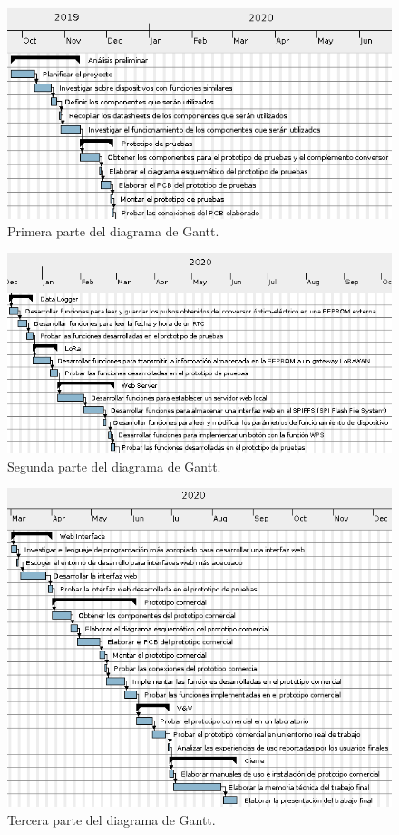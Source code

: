 \begin{figure}[h]
	\centering
	\includegraphics[scale=1]{./Figures/gantt1.png}
	\caption{Primera parte del diagrama de Gantt.}
	\label{fig:diagramAON}
\end{figure}

\begin{figure}[h]
	\centering
	\includegraphics[scale=1]{./Figures/gantt2.png}
	\caption{Segunda parte del diagrama de Gantt.}
	\label{fig:diagramAON}
\end{figure}

\begin{figure}[h]
	\centering
	\includegraphics[scale=1]{./Figures/gantt3.png}
	\caption{Tercera parte del diagrama de Gantt.}
	\label{fig:diagramAON}
\end{figure}

